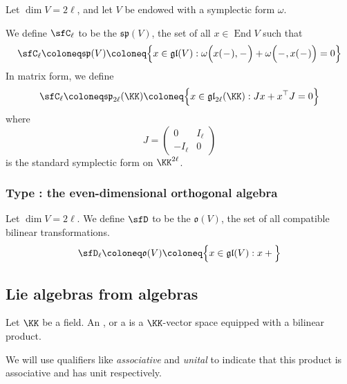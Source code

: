 \documentclass{article}
\newcommand*\wc{{\mkern 1mu-\mkern 1mu}}
\DeclareMathOperator{\End}{End}
\newcommand{\glalg}{\ensuremath{\mathfrak{gl}}}
\newcommand{\spalg}{\ensuremath{\mathfrak{sp}}}
\newcommand{\oalg}{\ensuremath{\mathfrak{o}}}
\begin{document}
\begin{definition}
    Let $\dim V = 2\ell$, and let $V$ be endowed with a symplectic form $\omega$.

    We define $\sfC_\ell$ to be the  $\spalg(V)$, the set of all $x \in \End V$ such that
    \[
        \sfC_\ell
        \coloneq
        \spalg(V)
        \coloneq
        \Big\{
            x \in \glalg(V)
            :
            \omega\Big(x(\wc),\wc\Big)
            + \omega\Big(\wc,x(\wc)\Big)
            =
            0
        \Big\}
    \]
    In matrix form, we define
    \[
        \sfC_\ell
        \coloneq
        \spalg_{2\ell}(\KK)
        \coloneq
        \Big\{
            x \in \glalg_{2\ell}(\KK)
            :
            Jx + x^\top J = 0
        \Big\}
    \]
    where
    \[
        J
        =
        \begin{pmatrix}
            0 & I_\ell \\
            -I_\ell & 0
        \end{pmatrix}
    \]
    is the standard symplectic form on $\KK^{2\ell}$.
\end{definition}

\subsubsection{Type \sfD: the even-dimensional orthogonal algebra}

\begin{definition}
    Let $\dim V = 2\ell$.
    We define $\sfD$ to be the  $\oalg(V)$, the set of all compatible bilinear transformations.
    \[
        \sfD_\ell
        \coloneq
        \oalg(V)
        \coloneq
        \Big\{
            x \in \glalg(V)
            :
            x + 
        \Big\}
    \]
\end{definition}

\subsection{Lie algebras from algebras}

\begin{definition}
    Let $\KK$ be a field.
    An , or a  is a $\KK$-vector space equipped with a bilinear product.

    We will use qualifiers like \textit{associative} and \textit{unital} to indicate that this product is associative and has unit respectively.
\end{definition}
\end{document}
